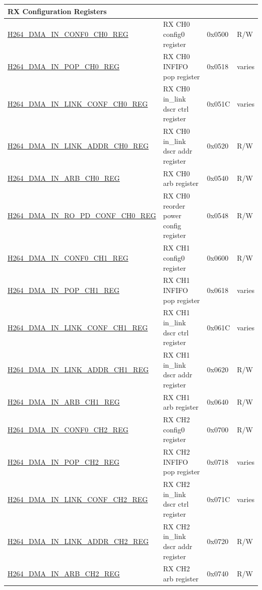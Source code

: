 \begin{longtable}{ | p{7.5cm} | p{5.7cm} | p{1.2cm} | p{1.5cm} | }
\multicolumn{4}{|l|}{\textbf{RX Configuration Registers}} \\ \hline
\hyperref[regdesc:H264DMAINCONF0CH0REG]{H264\_DMA\_IN\_CONF0\_CH0\_REG} & RX CH0 config0 register & 0x0500 & R/W \\ \hline
\hyperref[regdesc:H264DMAINPOPCH0REG]{H264\_DMA\_IN\_POP\_CH0\_REG} & RX CH0 INFIFO pop register & 0x0518 & varies \\ \hline
\hyperref[regdesc:H264DMAINLINKCONFCH0REG]{H264\_DMA\_IN\_LINK\_CONF\_CH0\_REG} & RX CH0 in\_link dscr ctrl register & 0x051C & varies \\ \hline
\hyperref[regdesc:H264DMAINLINKADDRCH0REG]{H264\_DMA\_IN\_LINK\_ADDR\_CH0\_REG} & RX CH0 in\_link dscr addr register & 0x0520 & R/W \\ \hline
\hyperref[regdesc:H264DMAINARBCH0REG]{H264\_DMA\_IN\_ARB\_CH0\_REG} & RX CH0 arb register & 0x0540 & R/W \\ \hline
\hyperref[regdesc:H264DMAINROPDCONFCH0REG]{H264\_DMA\_IN\_RO\_PD\_CONF\_CH0\_REG} & RX CH0 reorder power config register & 0x0548 & R/W \\ \hline

\hyperref[regdesc:H264DMAINCONF0CH1REG]{H264\_DMA\_IN\_CONF0\_CH1\_REG} & RX CH1 config0 register & 0x0600 & R/W \\ \hline
\hyperref[regdesc:H264DMAINPOPCH1REG]{H264\_DMA\_IN\_POP\_CH1\_REG} & RX CH1 INFIFO pop register & 0x0618 & varies \\ \hline
\hyperref[regdesc:H264DMAINLINKCONFCH1REG]{H264\_DMA\_IN\_LINK\_CONF\_CH1\_REG} & RX CH1 in\_link dscr ctrl register & 0x061C & varies \\ \hline
\hyperref[regdesc:H264DMAINLINKADDRCH1REG]{H264\_DMA\_IN\_LINK\_ADDR\_CH1\_REG} & RX CH1 in\_link dscr addr register & 0x0620 & R/W \\ \hline
\hyperref[regdesc:H264DMAINARBCH1REG]{H264\_DMA\_IN\_ARB\_CH1\_REG} & RX CH1 arb register & 0x0640 & R/W \\ \hline

\hyperref[regdesc:H264DMAINCONF0CH2REG]{H264\_DMA\_IN\_CONF0\_CH2\_REG} & RX CH2 config0 register & 0x0700 & R/W \\ \hline
\hyperref[regdesc:H264DMAINPOPCH2REG]{H264\_DMA\_IN\_POP\_CH2\_REG} & RX CH2 INFIFO pop register & 0x0718 & varies \\ \hline
\hyperref[regdesc:H264DMAINLINKCONFCH2REG]{H264\_DMA\_IN\_LINK\_CONF\_CH2\_REG} & RX CH2 in\_link dscr ctrl register & 0x071C & varies \\ \hline
\hyperref[regdesc:H264DMAINLINKADDRCH2REG]{H264\_DMA\_IN\_LINK\_ADDR\_CH2\_REG} & RX CH2 in\_link dscr addr register & 0x0720 & R/W \\ \hline
\hyperref[regdesc:H264DMAINARBCH2REG]{H264\_DMA\_IN\_ARB\_CH2\_REG} & RX CH2 arb register & 0x0740 & R/W \\ \hline


\end{longtable}
